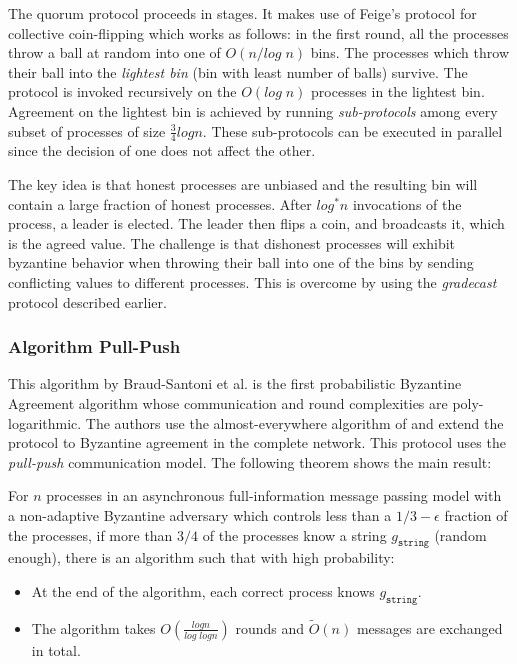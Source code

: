 The quorum protocol proceeds in stages. It makes use of Feige's protocol \cite{Feige99} for collective coin-flipping which works as follows: in the first round, all the processes throw a ball at random into one of $O(n/log\;n)$ bins. The processes which throw their ball into the \textit{lightest bin} (bin with least number of balls) survive. The protocol is invoked recursively on the $O(log\;n)$ processes in the lightest bin. Agreement on the lightest bin is achieved by running \textit{sub-protocols} among every subset of processes of size $\frac{3}{4}logn$. These sub-protocols can be executed in parallel since the decision of one does not affect the other.

The key idea is that honest processes are unbiased and the resulting bin will contain a large fraction of honest processes. After $log^* n$ invocations of the process, a leader is elected. The leader then flips a coin, and broadcasts it, which is the agreed value. The challenge is that dishonest processes will exhibit byzantine behavior when throwing their ball into one of the bins by sending conflicting values to different processes. This is overcome by using the \textit{gradecast} protocol described earlier. 

\subsubsection{Algorithm Pull-Push \cite{BGH13}}
This algorithm by Braud-Santoni et al. \cite{BGH13} is the first probabilistic Byzantine Agreement algorithm whose communication and round complexities are poly-logarithmic. The authors use the almost-everywhere algorithm of \cite{KSSV06} and extend the protocol to Byzantine agreement in the complete network. This protocol uses the \textit{pull-push} communication model. The following theorem shows the main result: 


\begin{theorem}
For $n$ processes in an asynchronous full-information message passing model with a non-adaptive Byzantine adversary which controls less than a $1/3 - \epsilon$ fraction of the processes, if more than $3/4$ of the processes know a string $g_{\mathtt{string}}$ (random enough), there is an algorithm such that with high probability:
\begin{itemize}
\item At the end of the algorithm, each correct process knows $g_{\mathtt{string}}$.
\item The algorithm takes $O(\frac{logn}{log \; logn})$ rounds and $\tilde{O}(n)$ messages are exchanged in total. 
\end{itemize}
\end{theorem}

